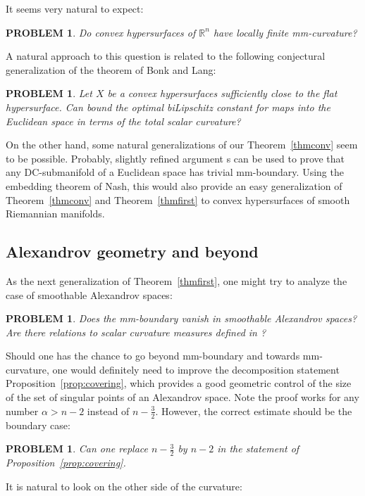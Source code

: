 \documentclass[12pt,leqno,intlimits]{amsart}
\numberwithin{equation}{section}
\newtheorem{quest}[thm]{PROBLEM}
\theoremstyle{definition}
\theoremstyle{remark}
\newcommand{\tref}[1]{Theorem~\ref{#1}}
\newcommand{\pref}[1]{Proposition~\ref{#1}}
\newcommand{\R}{\mathbb{R}}
\begin{document}
It seems very natural to expect:
\begin{quest}
Do  convex hypersurfaces of $\R^n$ have locally finite mm-curvature?
\end{quest}


 A natural approach to this question is related to  the following conjectural generalization of the theorem of Bonk and Lang:
 \begin{quest}
 Let $X$ be a convex hypersurfaces sufficiently close to the flat hypersurface. Can bound the optimal biLipschitz constant for maps into the Euclidean space in terms of the total scalar curvature?
 \end{quest}
 
On the other hand, some natural generalizations of our \tref{thmconv} seem to  be possible. Probably, slightly refined argument s can be used to 
prove that any DC-submanifold of a Euclidean space has trivial mm-boundary. Using the embedding theorem of Nash, this would also provide an easy generalization of \tref{thmconv} and \tref{thmfirst} to convex hypersurfaces of smooth Riemannian manifolds.



\subsection{Alexandrov geometry and beyond}
As the next generalization of \tref{thmfirst}, one might try  to analyze the case of smoothable Alexandrov spaces:

\begin{quest}
Does the mm-boundary vanish  in smoothable Alexandrov spaces?   Are there relations to scalar curvature measures defined in \cite{LP}?
\end{quest}


Should one has the chance to go beyond mm-boundary and towards mm-curvature, one would definitely need to improve the 
decomposition statement \pref{prop:covering}, which provides a good geometric control of the size of the set of singular points of an Alexandrov space. Note the proof works for any number $\alpha >n-2$ instead of $n-\frac 3 2$. However, the correct estimate should be the boundary case:  
\begin{quest} \label{qe:control}
Can one replace $n-\frac 3 2$ by $n-2$ in the statement of \pref{prop:covering}.
\end{quest}

 
 It is natural to look on the other side of the curvature:
 
\end{document}
